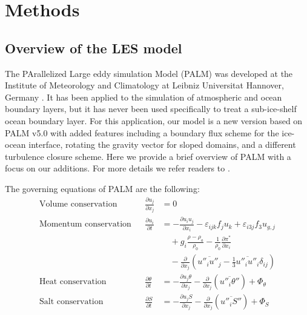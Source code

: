 \documentclass[draft]{agujournal2019}
\begin{document}
\section{Methods}\label{meth}

\subsection{Overview of the LES model}

The PArallelized Large eddy simulation Model (PALM) was developed at the Institute of Meteorology and Climatology at Leibniz Universitat Hannover, Germany \cite{raasch_palm-large-eddy_2001}. It has been applied to the simulation of atmospheric and ocean boundary layers, but it has never been used specifically to treat a sub-ice-shelf ocean boundary layer. For this application, our model is a new version based on PALM v5.0 \cite{maronga_parallelized_2015} with added features including a boundary flux scheme for the ice-ocean interface, rotating the gravity vector for sloped domains, and a different turbulence closure scheme. Here we provide a brief overview of PALM with a focus on our additions. For more details we refer readers to .

The governing equations of PALM are the following:\\
\begin{align}
    \textrm{Volume conservation} & &
        \frac{\partial u_j}{\partial x_j} &= 0\label{eq:volconserv}\\
    \textrm{Momentum conservation} & &
        \frac{\partial u_i}{\partial t} &= 
        -\frac{\partial u_i u_j}{\partial x_i}
        -\varepsilon_{ijk} f_j u_k 
        + \varepsilon_{i3j} f_3 u_{g,j}\nonumber\\
     &&& \quad + g_i \frac{\rho - \rho_a}{\rho_0} 
        - \frac{1}{\rho_0}\frac{\partial \pi^*}{\partial x_i} \nonumber\\
     &&& \quad - \frac{\partial}{\partial x_j}\left(\overline{u''_i u''_j} 
        - \frac{1}{3}\overline{u''_i u''_i}\delta_{ij}\right) \label{eq:uprog}\\
    \textrm{Heat conservation} & &
        \frac{\partial \theta}{\partial t} &= 
        -\frac{\partial u_j \theta}{\partial x_j} 
        - \frac{\partial}{\partial x_j}\left(\overline{u''_i \theta''}\right) 
        + \Phi_{\theta}\label{eq:ptprog}\\
    \textrm{Salt conservation} & &
        \frac{\partial S}{\partial t} &= 
        -\frac{\partial u_j S}{\partial x_j} 
        - \frac{\partial}{\partial x_j}\left(\overline{u''_i S''}\right) 
        + \Phi_{S}\label{eq:saprog}
\end{align}
\end{document}
